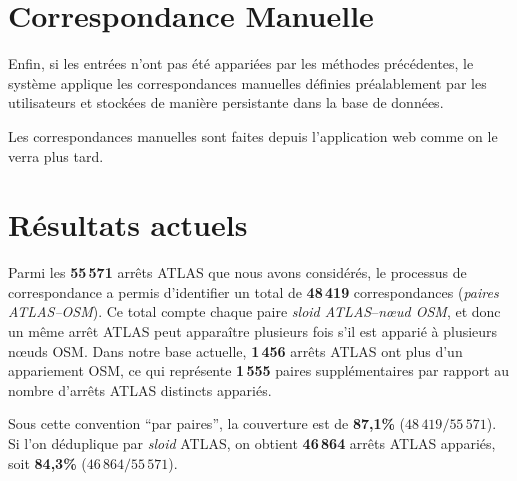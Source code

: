 \section{Correspondance Manuelle}

Enfin, si les entrées n'ont pas été appariées par les méthodes précédentes, le système applique les correspondances manuelles définies préalablement par les utilisateurs et stockées de manière persistante dans la base de données. 

Les correspondances manuelles sont faites depuis l'application web comme on le verra plus tard.

\section{Résultats actuels}

Parmi les \textbf{55\,571} arrêts ATLAS que nous avons considérés, le processus de correspondance a permis d'identifier un total de \textbf{48\,419} correspondances (\emph{paires ATLAS--OSM}). Ce total compte chaque paire \textit{sloid ATLAS}--\textit{nœud OSM}, et donc un même arrêt ATLAS peut apparaître plusieurs fois s'il est apparié à plusieurs nœuds OSM. Dans notre base actuelle, \textbf{1\,456} arrêts ATLAS ont plus d'un appariement OSM, ce qui représente \textbf{1\,555} paires supplémentaires par rapport au nombre d'arrêts ATLAS distincts appariés.

Sous cette convention ``par paires'', la couverture est de \textbf{87,1\%} (\(48\,419/55\,571\)). Si l'on déduplique par \textit{sloid} ATLAS, on obtient \textbf{46\,864} arrêts ATLAS appariés, soit \textbf{84,3\%} (\(46\,864/55\,571\)).

